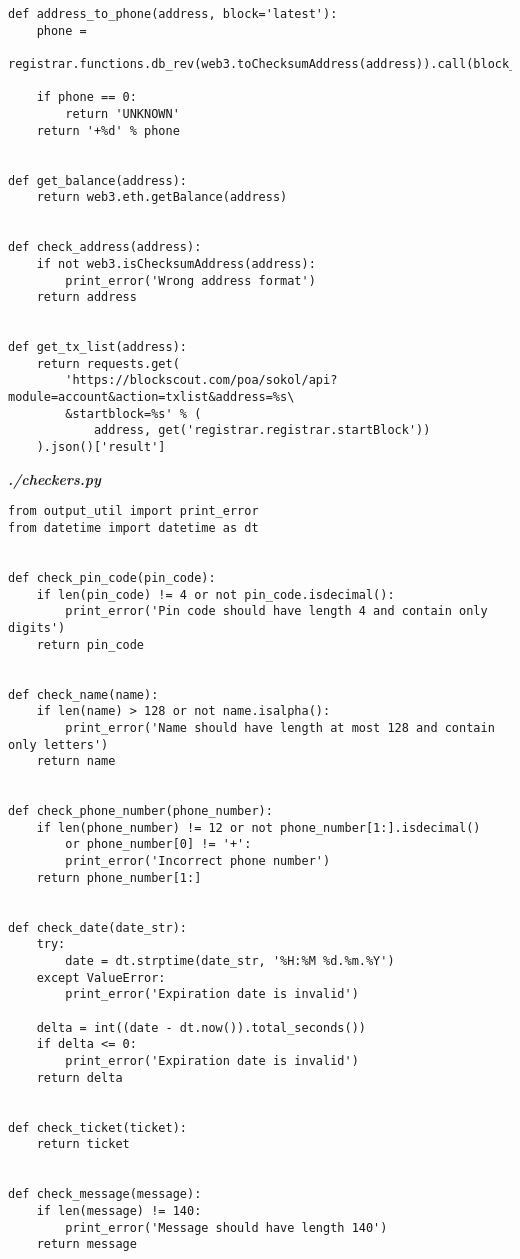 \begin{verbatim}
def address_to_phone(address, block='latest'):
    phone = 
        registrar.functions.db_rev(web3.toChecksumAddress(address)).call(block_identifier=block)

    if phone == 0:
        return 'UNKNOWN'
    return '+%d' % phone


def get_balance(address):
    return web3.eth.getBalance(address)


def check_address(address):
    if not web3.isChecksumAddress(address):
        print_error('Wrong address format')
    return address


def get_tx_list(address):
    return requests.get(
        'https://blockscout.com/poa/sokol/api?module=account&action=txlist&address=%s\
        &startblock=%s' % (
            address, get('registrar.registrar.startBlock'))
    ).json()['result']
\end{verbatim}

\textit{\textbf{./checkers.py}}
\begin{verbatim}
from output_util import print_error
from datetime import datetime as dt


def check_pin_code(pin_code):
    if len(pin_code) != 4 or not pin_code.isdecimal():
        print_error('Pin code should have length 4 and contain only digits')
    return pin_code


def check_name(name):
    if len(name) > 128 or not name.isalpha():
        print_error('Name should have length at most 128 and contain only letters')
    return name


def check_phone_number(phone_number):
    if len(phone_number) != 12 or not phone_number[1:].isdecimal() 
        or phone_number[0] != '+':
        print_error('Incorrect phone number')
    return phone_number[1:]


def check_date(date_str):
    try:
        date = dt.strptime(date_str, '%H:%M %d.%m.%Y')
    except ValueError:
        print_error('Expiration date is invalid')

    delta = int((date - dt.now()).total_seconds())
    if delta <= 0:
        print_error('Expiration date is invalid')
    return delta


def check_ticket(ticket):
    return ticket


def check_message(message):
    if len(message) != 140:
        print_error('Message should have length 140')
    return message
\end{verbatim}

